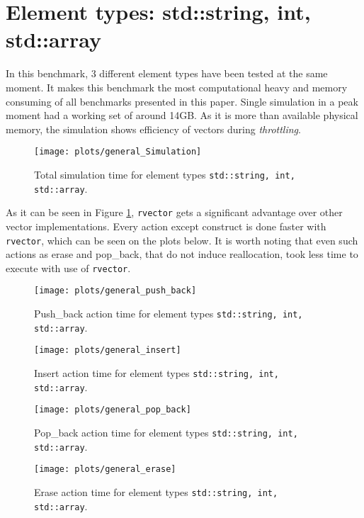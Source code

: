 \documentclass[inz, english, shortabstract]{iithesis}
\begin{document}
\clearpage
\section{Element types: std::string, int, std::array}
In this benchmark, 3 different element types have been tested at the same moment. It makes this benchmark the most computational heavy and memory consuming of all benchmarks presented in this paper. Single simulation in a peak moment had a working set of around 14GB. As it is more than available physical memory,  the simulation shows efficiency of vectors during \emph{throttling}.

\begin{figure}[h!]
\texttt{[image: plots/general\_Simulation]}
\caption{Total simulation time for element types \lstinline{std::string, int, std::array}.}
\label{general_simulation}
\end{figure}

As it can be seen in Figure \ref{general_simulation}, {\tt rvector} gets a significant advantage over other vector implementations. Every action except construct is done faster with {\tt rvector}, which can be seen on the plots below. It is worth noting that even such actions as erase and pop\_back, that do not induce reallocation, took less time to execute with use of {\tt rvector}. 

\begin{figure}[h!]
\texttt{[image: plots/general\_push\_back]}
\caption{Push\_back action time for element types \lstinline{std::string, int, std::array}.}
\label{general_push_back}
\end{figure}

\begin{figure}[h!]
\texttt{[image: plots/general\_insert]}
\caption{Insert action time for element types \lstinline{std::string, int, std::array}.}
\label{general_insert}
\end{figure}

\begin{figure}[h!]
\texttt{[image: plots/general\_pop\_back]}
\caption{Pop\_back action time for element types \lstinline{std::string, int, std::array}.}
\label{general_pop_back}
\end{figure}

\begin{figure}[h!]
\texttt{[image: plots/general\_erase]}
\caption{Erase action time for element types \lstinline{std::string, int, std::array}.}
\label{general_erase}
\end{figure}
\end{document}
